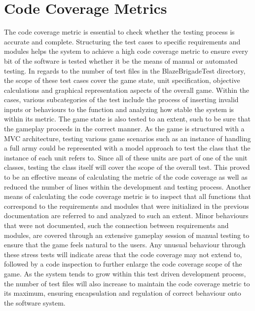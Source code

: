\documentclass{article}
\begin{document}
\section{Code Coverage Metrics}
The code coverage metric is essential to check whether the testing process is accurate and complete. Structuring the test cases to specific requirements and modules helps the system to achieve a high code coverage metric to ensure every bit of the software is tested whether it be the means of manual or automated testing. In regards to the number of test files in the BlazeBrigadeTest directory, the scope of these test cases cover the game state, unit specification, objective calculations and graphical representation aspects of the overall game. Within the cases, various subcategories of the test include the process of inserting invalid inputs or behaviours to the function and analyzing how stable the system is within its metric. The game state is also tested to an extent, such to be sure that the gameplay proceeds in the correct manner. As the game is structured with a MVC architecture, testing various game scenarios such as an instance of handling a full army could be represented with a model approach to test the class that the instance of each unit refers to. Since all of these units are part of one of the unit classes, testing the class itself will cover the scope of the overall test. This proved to be an effective means of calculating the metric of the code coverage as well as reduced the number of lines within the development and testing process. Another means of calculating the code coverage metric is to inspect that all functions that correspond to the requirements and modules that were initialized in the previous documentation are referred to and analyzed to such an extent. Minor behaviours that were not documented, such the connection between requirements and modules, are covered through an extensive gameplay session of manual testing to ensure that the game feels natural to the users. Any unusual behaviour through these stress tests will indicate areas that the code coverage may not extend to, followed by a code inspection to further enlarge the code coverage scope of the game. As the system tends to grow within this test driven development process, the number of test files will also increase to maintain the code coverage metric to its maximum, ensuring encapsulation and regulation of correct behaviour onto the software system.
\end{document}

